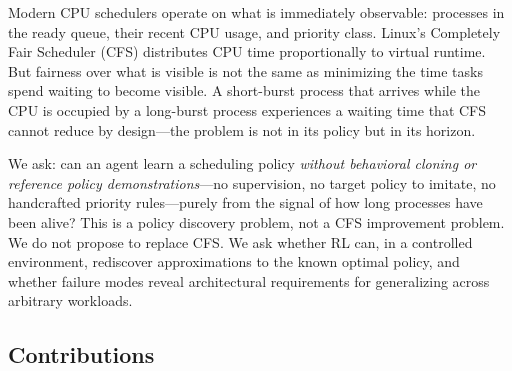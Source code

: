 \documentclass[10pt,twocolumn]{article}
\theoremstyle{remark}
\begin{document}
Modern CPU schedulers operate on what is immediately observable:
processes in the ready queue, their recent CPU usage, and priority
class. Linux's Completely Fair Scheduler (CFS) distributes CPU time
proportionally to virtual runtime. But fairness over what is visible
is not the same as minimizing the time tasks spend waiting to become
visible. A short-burst process that arrives while the CPU is occupied
by a long-burst process experiences a waiting time that CFS cannot
reduce by design---the problem is not in its policy but in its horizon.

We ask: can an agent learn a scheduling policy \emph{without behavioral
cloning or reference policy demonstrations}---no supervision, no target
policy to imitate, no handcrafted priority rules---purely from the
signal of how long processes have been alive? This is a policy
discovery problem, not a CFS improvement problem. We do not propose
to replace CFS. We ask whether RL can, in a controlled environment,
rediscover approximations to the known optimal policy, and whether
failure modes reveal architectural requirements for generalizing
across arbitrary workloads.

\subsection*{Contributions}
\end{document}
